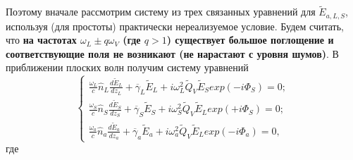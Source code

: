 \documentclass[a4paper]{article}
\begin{document}
Поэтому вначале рассмотрим систему из трех связанных уравнений для $\tilde{E}_{a,L,S}$, используя (для простоты) практически нереализуемое условие. Будем считать, что  \textbf{на частотах $\omega_{L}\pm q\omega_{V}$ (где $q>1$) существует большое поглощение и соответствующие поля не возникают (не нарастают с уровня шумов)}.  В приближении плоских волн получим систему уравнений 
\begin{equation}
	\begin{cases}
		\frac{\omega_{L}}{c}\hat{n}_{L}\frac{d\tilde{E}_{L}}{dz_{L}}+\overline{\gamma}_{L}\tilde{E}_{L}+i\omega_{L}^{2}\tilde{Q}_{V}\tilde{E}_{S}exp(-i\Phi_{S})=0;\\
		
		\frac{\omega_{S}}{c}\hat{n}_{S}\frac{d\tilde{E}_{S}}{dz_{S}}+\overline{\gamma}_{S}\tilde{E}_{S}+i\omega_{S}^{2}\tilde{Q}_{V}\tilde{E}_{L}exp(+i\Phi_{S})=0;\\
		
		\frac{\omega_{a}}{c}\hat{n}_{a}\frac{d\tilde{E}_{a}}{dz_{a}}+\overline{\gamma}_{a}\tilde{E}_{a}+i\omega_{a}^{2}\tilde{Q}_{V}\tilde{E}_{L}exp(-i\Phi_{a})=0,
	\end{cases}\label{1.3.30}
\end{equation}
где
\end{document}
